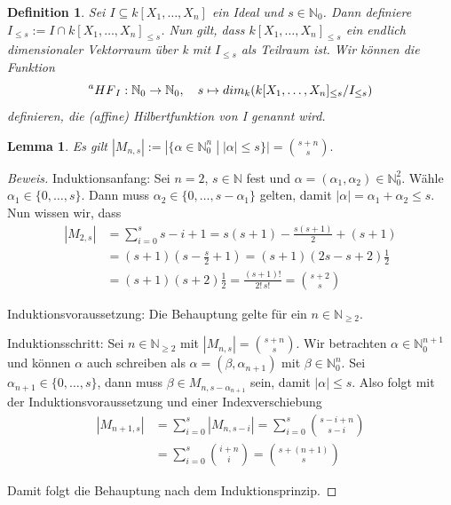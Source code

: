 \documentclass{article}
\newtheorem{definition}[satz]{Definition}
\newtheorem{lemma}[satz]{Lemma}
\newcommand*{\R}{k[X_{1},\ldots,X_{n}]}
\begin{document}
	\begin{definition} \label{1.2.11}
	Sei \(I \subseteq \R\) ein Ideal und \(s \in \mathbb{N}_{0}\). Dann definiere \(I_{\leq s} :=
	I \cap \R_{\leq s}\). Nun gilt, dass \(\R_{\leq s}\) ein endlich dimensionaler Vektorraum über
	k  mit \(I_{\leq s}\) als Teilraum ist. Wir können die Funktion \begin{displaymath}
	\prescript{a}{}{HF}_{I} : \mathbb{N}_{0} \rightarrow \mathbb{N}_{0}, \quad s \mapsto
	dim_{k}(\R_{\leq s}/I_{\leq s})	\end{displaymath} definieren, die (affine) Hilbertfunktion
	von I genannt wird.
	\end{definition}

	
	\begin{lemma}\label{kombinatorik}
	Es gilt \(|M_{n,s}| := |\{\alpha \in \mathbb{N}^{n}_{0}\; |\; |\alpha| \leq s \}| = \binom{s + n}{s}. \)
	\end{lemma}

	\begin{proof}[Beweis]
	Induktionsanfang: Sei \(n = 2\), \(s \in \mathbb{N}\) fest und \(\alpha = (\alpha_{1}, 
	\alpha_{2}) \in \mathbb{N}^{2}_{0}\). Wähle \(\alpha_{1} \in \{0, \ldots, s\}\). Dann muss
	\(\alpha_{2} \in \{0, \ldots, s - \alpha_{1}\}\) gelten, damit \(|\alpha| = \alpha_{1} +
	\alpha_{2} \leq s\). Nun wissen wir, dass
	\begin{align*}
		|M_{2,s}| &= \sum_{i=0}^{s} s-i+1 = s(s+1) - \frac{s(s+1)}{2} + (s+1) \\
		&= (s+1)(s - \frac{s}{2} + 1) = (s+1)(2s - s +2)\frac{1}{2} \\
		&= (s+1)(s+2)\frac{1}{2} = \frac{(s+1)!}{2!\,s!} = \binom{s+2}{s}
	\end{align*}
	
	Induktionsvoraussetzung: Die Behauptung gelte für ein \(n \in \mathbb{N}_{\geq 2}\).

	Induktionsschritt: Sei \(n \in \mathbb{N}_{\geq 2}\) mit \(|M_{n,s}| = \binom{s + n}{s}\). Wir
	betrachten \(\alpha \in \mathbb{N}^{n+1}_{0}\) und können \(\alpha\) auch schreiben als
	\(\alpha = (\beta, \alpha_{n+1})\) mit \(\beta \in \mathbb{N}^{n}_{0}\). Sei \(\alpha_{n+1}
	\in \{0, \ldots, s\}\), dann muss \(\beta \in M_{n,s-\alpha_{n+1}}\) sein, damit
	\(|\alpha| \leq s\). Also folgt mit der Induktionsvoraussetzung und einer Indexverschiebung
	\begin{align*}
		|M_{n+1,s}| &= \sum_{i=0}^{s} |M_{n,s-i}| = \sum_{i=0}^{s} \binom{s-i+n}{s-i} \\
		&= \sum_{i=0}^{s} \binom{i+n}{i} = \binom{s+(n+1)}{s}
	\end{align*}

	Damit folgt die Behauptung nach dem Induktionsprinzip.
	\end{proof}
\end{document}
